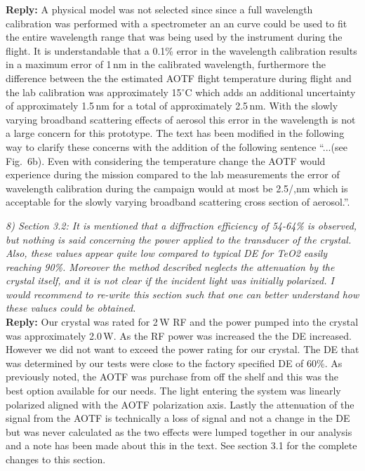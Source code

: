 \documentclass[12pt, notitlepage]{article}
\begin{document}
\textbf{Reply:} A physical model was not selected since since a full wavelength calibration was performed with a spectrometer an an curve could be used to fit the entire wavelength range that was being used by the instrument during the flight. It is understandable that a 0.1\% error in the wavelength calibration results in a maximum error of 1\,nm in the calibrated wavelength, furthermore the difference between the the estimated AOTF flight temperature during flight and the lab calibration was approximately 15$^{\circ}$C which adds an additional uncertainty of approximately 1.5\,nm for a total of approximately 2.5\,nm. With the slowly varying broadband scattering effects of aerosol this error in the wavelength is not a large concern for this prototype. The text has been modified in the following way to clarify these concerns with the addition of the following sentence ``...(see Fig.~6b). Even with considering the temperature change the AOTF would experience during the mission compared to the lab measurements the error of wavelength calibration during the campaign would at most be 2.5/,nm which is acceptable for the slowly varying broadband scattering cross section of aerosol.''.

\hrulefill

\textit{8) Section 3.2: It is mentioned that a diffraction efficiency of 54-64\% is observed, but
nothing is said concerning the power applied to the transducer of the crystal. Also,
these values appear quite low compared to typical DE for TeO2 easily reaching 90\%.
Moreover the method described neglects the attenuation by the crystal itself, and it is
not clear if the incident light was initially polarized. I would recommend to re-write this
section such that one can better understand how these values could be obtained.}\\

\textbf{Reply:} Our crystal was rated for 2\,W RF and the power pumped into the crystal was approximately 2.0\,W. As the RF power was increased the the DE increased. However we did not want to exceed the power rating for our crystal. The DE that was determined by our tests were close to the factory specified DE of 60\%. As previously noted, the AOTF was purchase from off the shelf and this was the best option available for our needs. The light entering the system was linearly polarized aligned with the AOTF polarization axis. Lastly the attenuation of the signal from the AOTF is technically a loss of signal and not a change in the DE but was never calculated as the two effects were lumped together in our analysis and a note has been made about this in the text. See section 3.1 for the complete changes to this section.
\end{document}

